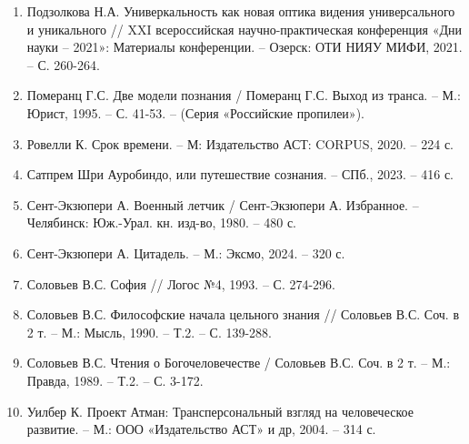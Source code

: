 \begin{enumerate}
        \item Подзолкова Н.А. Универкальность как новая оптика видения универсального и уникального // XXI всероссийская научно-практическая конференция «Дни науки – 2021»: Материалы конференции. – Озерск: ОТИ НИЯУ МИФИ, 2021. – С. 260-264.
        \item Померанц Г.С. Две модели познания / Померанц Г.С. Выход из транса. – М.: Юрист, 1995. – С. 41-53. – (Серия «Российские пропилеи»).
        \item Ровелли К. Срок времени. – М: Издательство АСТ: CORPUS, 2020. – 224 с.
        \item Сатпрем Шри Ауробиндо, или путешествие сознания. – СПб., 2023. – 416 с.
        \item Сент-Экзюпери А. Военный летчик / Сент-Экзюпери А. Избранное. – Челябинск: Юж.-Урал. кн. изд-во, 1980. – 480 с.
        \item Сент-Экзюпери А. Цитадель. – М.: Эксмо, 2024. – 320 с.
        \item Соловьев В.С. София // Логос №4, 1993. – С. 274-296.
        \item Соловьев В.С. Философские начала цельного знания // Соловьев В.С. Соч. в 2 т. – М.: Мысль, 1990. – Т.2. – С. 139-288.
        \item Соловьев В.С. Чтения о Богочеловечестве / Соловьев В.С. Соч. в 2 т. – М.: Правда, 1989. – Т.2. – С. 3-172.
        \item Уилбер К. Проект Атман: Трансперсональный взгляд на человеческое развитие. – М.: ООО «Издательство АСТ» и др, 2004. – 314 с.
    \end{enumerate}
\fi
